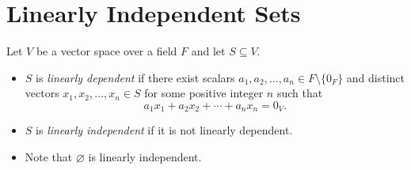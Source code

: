 \section{Linearly Independent Sets}
\begin{definition}\label{def:linear-independence}
  Let $V$ be a vector space over a field $F$ and let $S \subseteq V$.
  \begin{itemize}
    \item $S$ is \emph{linearly dependent} if there exist scalars
      $a_1, a_2, \dots, a_n \in F \setminus \{0_F\}$ and distinct vectors
      $x_1, x_2, \dots, x_n \in S$ for some positive integer $n$ such that
      \begin{equation*}
        a_1x_1 + a_2x_2 + \cdots + a_nx_n = 0_V.
      \end{equation*}
    \item $S$ is \emph{linearly independent} if it is not linearly dependent.
  \end{itemize}
\end{definition}

\begin{remark}
  \leavevmode
  \begin{itemize}
    \item Note that $\varnothing$ is linearly independent.
  \end{itemize}
\end{remark}

